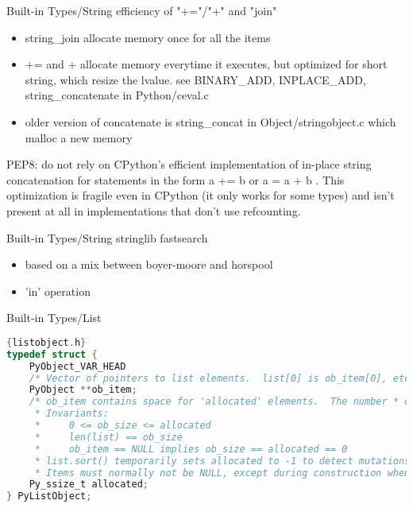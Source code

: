 \documentclass[xcolor=svgnames]{beamer}
\begin{document}
\begin{frame}{Built-in Types/String}
efficiency of "+="/"+" and "join"
\begin{itemize}
    \item string\_join allocate memory once for all the items
    \item += and + allocate memory everytime it executes, but optimized for short string, which resize the lvalue. see BINARY\_ADD, INPLACE\_ADD, string\_concatenate in Python/ceval.c
    \item older version of concatenate is string\_concat in Object/stringobject.c which malloc a new memory
\end{itemize}
PEP8: do not rely on CPython's efficient implementation of in-place string concatenation for statements in the form a += b or a = a + b . This optimization is fragile even in CPython (it only works for some types) and isn't present at all in implementations that don't use refcounting. 
\end{frame}

\begin{frame}{Built-in Types/String}
stringlib fastsearch 
\begin{itemize}
    \item based on a mix between boyer-moore and horspool
    \item 'in' operation
\end{itemize}
\end{frame}

\begin{frame}[fragile]{Built-in Types/List}
\begin{lstlisting}[language=C]{listobject.h}
typedef struct {
    PyObject_VAR_HEAD
    /* Vector of pointers to list elements.  list[0] is ob_item[0], etc. */
    PyObject **ob_item;
    /* ob_item contains space for 'allocated' elements.  The number * currently in use is ob_size.
     * Invariants:
     *     0 <= ob_size <= allocated
     *     len(list) == ob_size
     *     ob_item == NULL implies ob_size == allocated == 0
     * list.sort() temporarily sets allocated to -1 to detect mutations.
     * Items must normally not be NULL, except during construction when * the list is not yet visible outside the function that builds it.  */
    Py_ssize_t allocated;
} PyListObject;
\end{lstlisting} 
\end{frame}
\end{document}
